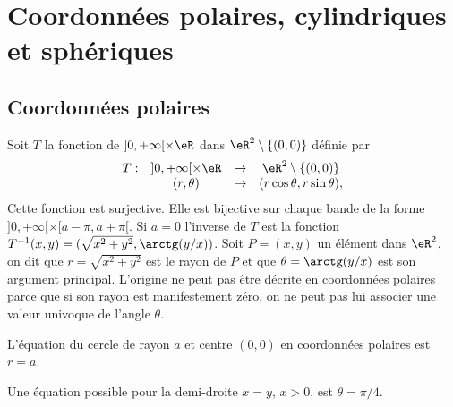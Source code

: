 \section{Coordonnées polaires, cylindriques et sphériques}\label{sec_coord}
\subsection{Coordonnées polaires}
Soit $T$ la fonction de $]0, +\infty[\times \eR$ dans $\eR^2\setminus\{(0,0)\}$ définie par
\begin{equation}
  \begin{array}{lccc}
    T: &]0, +\infty[\times \eR & \to & \eR^2\setminus\{(0,0)\}\\
 & (r, \theta)&\mapsto& (r\cos \theta, r \sin \theta),
  \end{array}
\end{equation}
Cette fonction est surjective. Elle est bijective sur chaque bande de la forme  $]0, +\infty[\times [a-\pi,a+\pi[$. Si $a=0$ l'inverse de $T$  est la fonction $T^{-1}(x,y)= (\sqrt{x^2+y^2}, \arctg (y/x))$. Soit $P=(x,y)$ un élément dans $\eR^2$, on dit que $r=\sqrt{x^2+y^2}$ est le rayon de $P$ et que $\theta=\arctg (y/x) $ est son argument principal. L'origine ne peut pas être décrite en coordonnées polaires parce que si son rayon est manifestement zéro, on ne peut pas lui associer une valeur univoque de l'angle $\theta$. 
\begin{example}
L'équation du cercle de rayon $a$ et centre $(0, 0)$ en coordonnées polaires est $r=a$. 
\end{example}

\begin{example}
	Une équation possible pour la demi-droite $x=y$, $x>0$,  est $\theta=\pi/4$.         
\end{example}

